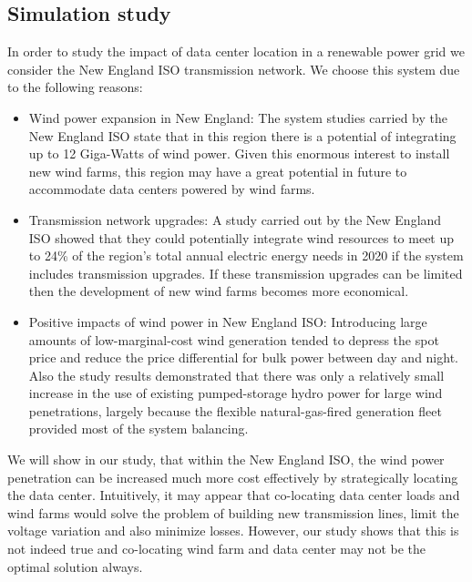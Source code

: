 \subsection{Simulation study}
In order to study the impact of data center location in a renewable power grid we consider the New England ISO transmission network. We choose this system due to the following reasons:
\begin{itemize}
\item{Wind power expansion in New England: The system studies carried by the New England ISO state that in this region there is a potential of integrating up to 12 Giga-Watts of wind power. Given this enormous interest to install new wind farms, this region may have a great potential in future to accommodate data centers powered by wind farms.}
\item{Transmission network upgrades: A study carried out by the New England ISO showed that they could potentially integrate wind resources to meet up to 24\% of the region's total annual electric energy needs in 2020 if the system includes transmission
upgrades. If these transmission upgrades can be limited then the development of new wind farms becomes more economical.}
\item{Positive impacts of wind power in New England ISO: Introducing large amounts of low-marginal-cost wind generation tended to depress the spot price and reduce the price differential for bulk power between day and night. Also the study results demonstrated that there was only a relatively small increase in the use of existing pumped-storage hydro power for large wind penetrations, largely because the flexible natural-gas-fired generation fleet provided most of the system balancing.}
\end{itemize}
We will show in our study, that within the New England ISO, the wind power penetration can be increased much more cost effectively by strategically locating the data center. Intuitively, it may appear that co-locating data center loads and wind farms would solve the problem of building new transmission lines, limit the voltage variation and also minimize losses. However, our study shows that this is not indeed true and co-locating wind farm and data center may not be the optimal solution always.
